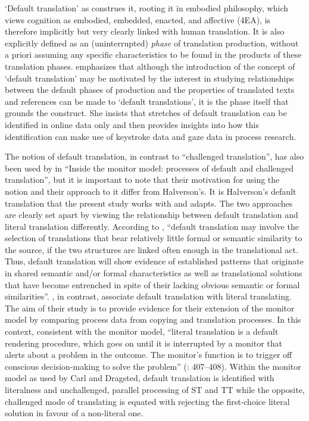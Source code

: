 \documentclass[output=paper]{langscibook}
\begin{document}
‘Default translation’ as \citet[188]{Halverson2019} construes it, rooting it in embodied philosophy, which views cognition as embodied, embedded, enacted, and affective (4EA), is therefore implicitly but very clearly linked with human translation. It is also explicitly defined as an (uninterrupted) \textit{phase} of translation production, without a priori assuming any specific characteristics to be found in the products of these translation phases. \citet[191]{Halverson2019} emphasizes that although the introduction of the concept of ‘default translation’ may be motivated by the interest in studying relationships between the default phases of production and the properties of translated texts and references can be made to ‘default translations’, it is the phase itself that grounds the construct. She insists that stretches of default translation can be identified in online data only and then provides insights into how this identification can make use of keystroke data and gaze data in process research.

The notion of default translation, in contrast to “challenged translation”, has also been used by \citet[128--129]{CarlDragsted2012} in “Inside the monitor model: processes of default and challenged translation”, but it is important to note that their motivation for using the notion and their approach to it differ from Halverson’s. It is Halverson’s default translation that the present study works with and adapts. The two approaches are clearly set apart by viewing the relationship between default translation and literal translation differently. According to \citet[195]{Halverson2019}, “default translation may involve the selection of translations that bear relatively little formal or semantic similarity to the source, if the two structures are linked often enough in the translational act. Thus, default translation will show evidence of established patterns that originate in shared semantic and/or formal characteristics as well as translational solutions that have become entrenched in spite of their lacking obvious semantic or formal similarities”. \citet{CarlDragsted2012}, in contrast, associate default translation with literal translating. The aim of their study is to provide evidence for their extension of the monitor model \citep{Tirkkonen-Condit2005} by comparing process data from copying and translation processes. In this context, consistent with the monitor model, “literal translation is a default rendering procedure, which goes on until it is interrupted by a monitor that alerts about a problem in the outcome. The monitor’s function is to trigger off conscious decision-making to solve the problem” (\citealt{Tirkkonen-Condit2005}: 407–408). Within the monitor model as used by Carl and Dragsted, default translation is identified with literalness and unchallenged, parallel processing of ST and TT while the opposite, challenged mode of translating is equated with rejecting the first-choice literal solution in favour of a non-literal one.
\end{document}
